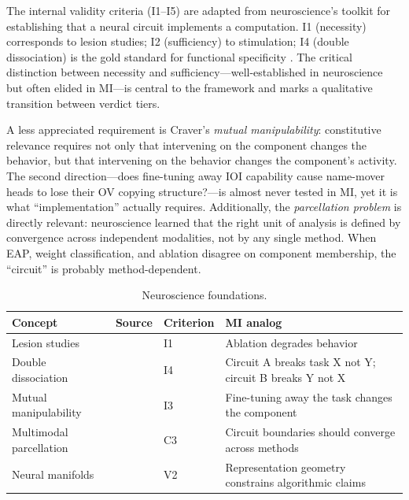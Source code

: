 \documentclass[10pt]{article}
\begin{document}
The internal validity criteria (I1--I5) are adapted from neuroscience's toolkit for establishing that a neural circuit implements a computation. I1 (necessity) corresponds to lesion studies; I2 (sufficiency) to stimulation; I4 (double dissociation) is the gold standard for functional specificity \citep{woodward2003making}. The critical distinction between necessity and sufficiency---well-established in neuroscience but often elided in MI---is central to the framework and marks a qualitative transition between verdict tiers.

A less appreciated requirement is Craver's \emph{mutual manipulability}: constitutive relevance requires not only that intervening on the component changes the behavior, but that intervening on the behavior changes the component's activity. The second direction---does fine-tuning away IOI capability cause name-mover heads to lose their OV copying structure?---is almost never tested in MI, yet it is what ``implementation'' actually requires. Additionally, the \emph{parcellation problem} is directly relevant: neuroscience learned that the right unit of analysis is defined by convergence across independent modalities, not by any single method. When EAP, weight classification, and ablation disagree on component membership, the ``circuit'' is probably method-dependent.

\begin{table}[H]
\centering\small
\caption{Neuroscience foundations.}
\renewcommand{\arraystretch}{1.12}
\begin{tabular}{@{}l>{\raggedright\arraybackslash}p{2cm}l>{\raggedright\arraybackslash}p{4.5cm}@{}}
\toprule
\textbf{Concept} & \textbf{Source} & \textbf{Criterion} & \textbf{MI analog} \\
\midrule
Lesion studies & \citet{shallice1988neuropsychology} & I1 & Ablation degrades behavior \\
\midrule
Double dissociation & \citet{shallice1988neuropsychology} & I4 & Circuit A breaks task X not Y; circuit B breaks Y not X \\
\midrule
Mutual manipulability & \citet{craver2007explaining} & I3 & Fine-tuning away the task changes the component \\
\midrule
Multimodal parcellation & \citet{glasser2016multi} & C3 & Circuit boundaries should converge across methods \\
\midrule
Neural manifolds & \citet{gallego2017neural} & V2 & Representation geometry constrains algorithmic claims \\
\bottomrule
\end{tabular}
\end{table}
\end{document}
